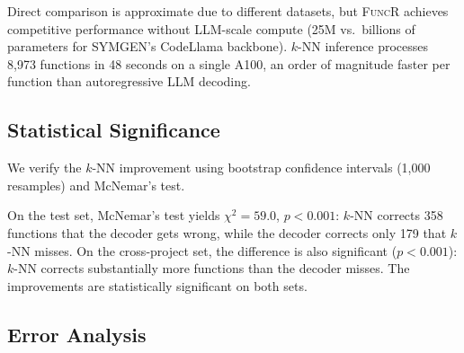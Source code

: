 \documentclass[sigconf,nonacm]{acmart}
\newcommand{\sysname}{\textsc{FuncR}}
\begin{document}
Direct comparison is approximate due to different datasets, but \sysname{} achieves competitive performance without LLM-scale compute (25M vs.\ billions of parameters for SYMGEN's CodeLlama backbone). $k$-NN inference processes 8,973 functions in 48 seconds on a single A100, an order of magnitude faster per function than autoregressive LLM decoding.

\subsection{Statistical Significance}

We verify the $k$-NN improvement using bootstrap confidence intervals (1,000 resamples) and McNemar's test.

\begin{table}[t]
    \centering
    \caption{Bootstrap 95\% confidence intervals and McNemar's test. CIs do not overlap on either set.}
    \label{tab:significance}
\end{table}

On the test set, McNemar's test yields $\chi^2{=}59.0$, $p{<}0.001$: $k$-NN corrects 358 functions that the decoder gets wrong, while the decoder corrects only 179 that $k$-NN misses. On the cross-project set, the difference is also significant ($p{<}0.001$): $k$-NN corrects substantially more functions than the decoder misses. The improvements are statistically significant on both sets.

\subsection{Error Analysis}
\end{document}
